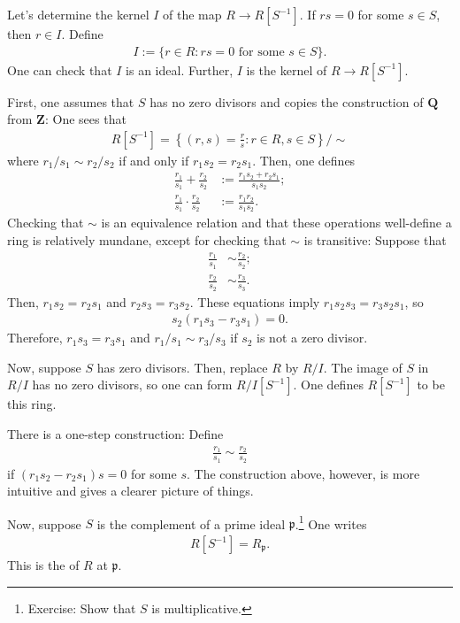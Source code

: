 \documentclass [11 pt, oneside] {article}
\begin{document}
Let's determine the kernel $I$ of the map $R\longrightarrow R[S^{-1}]$. If $rs=0$ for some $s\in S$, then $r\in I$. Define
\begin{align*}
	I := \{r\in R: rs=0\textrm{ for some $s\in S$}\}.
\end{align*}
One can check that $I$ is an ideal. Further, $I$ is the kernel of $R\longrightarrow R[S^{-1}]$.

First, one assumes that $S$ has no zero divisors and copies the construction of $\mathbf{Q}$ from $\mathbf{Z}$: One sees that
\begin{align*}
	R[S^{-1}] = \left\{ (r,s) =  \frac{r}{s} : r\in R, s\in S \right\}/\sim 
\end{align*}
where $r_1/s_1 \sim r_2/s_2$ if and only if $r_1s_2 = r_2s_1$. Then, one defines 
\begin{align*}
	\frac{r_1}{s_1}+\frac{r_2}{s_2} &:= \frac{r_1s_2+r_2s_1}{s_1s_2};\\
	\frac{r_1}{s_1}\cdot\frac{r_2}{s_2}&:= \frac{r_1r_2}{s_1s_2}.
\end{align*}
Checking that $\sim$ is an equivalence relation and that these operations well-define a ring is relatively mundane, except for checking that $\sim$ is transitive: Suppose that
\begin{align*}
	\frac{r_1}{s_1}&\sim \frac{r_2}{s_2};\\
	\frac{r_2}{s_2}&\sim \frac{r_3}{s_3}.
\end{align*}
Then, $r_1s_2=r_2s_1$ and $r_2s_3=r_3s_2$. These equations imply $r_1s_2s_3=r_3s_2s_1$, so
\begin{align*}
	s_2(r_1s_3-r_3s_1)=0.
\end{align*}
Therefore, $r_1s_3=r_3s_1$ and $r_1/s_1\sim r_3/s_3$ if $s_2$ is not a zero divisor.

Now, suppose $S$ has zero divisors. Then, replace $R$ by $R/I$. The image of $S$ in $R/I$ has no zero divisors, so one can form $R/I[S^{-1}]$. One defines $R[S^{-1}]$ to be this ring. 

There is a one-step construction: Define
\begin{align*}
\frac{r_1}{s_1}\sim \frac{r_2}{s_2}	
\end{align*}
if $(r_1s_2-r_2s_1)s=0$ for some $s$. The construction above, however, is more intuitive and gives a clearer picture of things.

Now, suppose $S$ is the complement of a prime ideal $\mathfrak{p}$.\footnote{Exercise: Show that $S$ is multiplicative.} One writes
\begin{align*}
	R[S^{-1}] = R_{\mathfrak{p}}.
\end{align*}
This is the  of $R$ at $\mathfrak{p}$.
\end{document}
